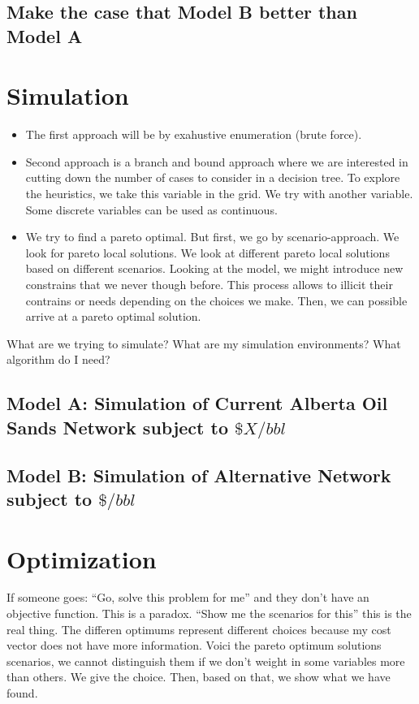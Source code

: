 \documentclass[12pt]{article}
\begin{document}
\subsection{Make the case that Model B better than Model A}


\section{Simulation}
\begin{itemize}
\item The first approach will be by exahustive enumeration (brute force). 
\item Second approach is a branch and bound approach where we are interested in cutting down the number of cases to consider in a decision tree. To explore the heuristics, we take this variable in the grid. We try with another variable. Some discrete variables can be used as continuous. 
\item We try to find a pareto optimal. But first, we go by scenario-approach. We look for pareto local solutions. We look at different pareto local solutions based on different scenarios. Looking at the model, we might introduce new constrains that we never though before. This process allows to illicit their contrains or needs depending on the choices we make. Then, we can possible arrive at a pareto optimal solution. 
\end{itemize}

What are we trying to simulate? What are my simulation environments? What algorithm do I need?

\subsection{Model A: Simulation of Current Alberta Oil Sands Network subject to $\$X/bbl$}
\subsection{Model B: Simulation of Alternative Network subject to $\$/bbl$}


\section{Optimization}
If someone goes: ``Go, solve this problem for me'' and they don't have an objective function. This is a paradox. ``Show me the scenarios for this'' this is the real thing. The differen optimums represent different choices because my cost vector does not have more information. Voici the pareto optimum solutions scenarios, we cannot distinguish them if we don't weight in some variables more than others. We give the choice. Then, based on that, we show what we have found. 
\end{document}
